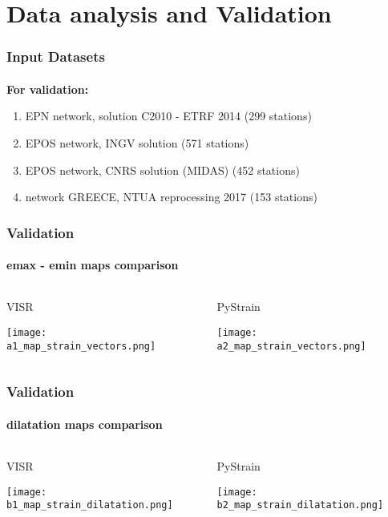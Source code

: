 \section{Data analysis and Validation}

\graphicspath{{Chapter3/Figs/}}

\begin{frame}
  \frametitle{Input Datasets}
  \framesubtitle{}
  \label{ch3:data}
  
  \textbf{For validation:}
  \begin{enumerate}
    \item EPN network, solution C2010 - ETRF 2014 (299 stations)
    \item EPOS network, INGV solution (571 stations)
    \item EPOS network, CNRS solution (MIDAS) (452 stations)
    \item network GREECE, NTUA reprocessing 2017 (153 stations)
  \end{enumerate}
    
\end{frame}
\note{}

\begin{frame}
  \frametitle{Validation}
  \framesubtitle{emax - emin maps comparison}
  \label{ch3:data}
  
  \begin{columns}
    \begin{column}{0.5\textwidth}
      VISR
      
      \texttt{[image: a1\_map\_strain\_vectors.png]}   
    \end{column}
    \begin{column}{0.5\textwidth}
    \begin{center}
      PyStrain
      
      \texttt{[image: a2\_map\_strain\_vectors.png]}     
    \end{center}
    \end{column}
  \end{columns}

\end{frame}
\note{}

\begin{frame}
  \frametitle{Validation}
  \framesubtitle{dilatation maps comparison}
  \label{ch3:data}
  
  \begin{columns}
    \begin{column}{0.5\textwidth}
      VISR
      
      \texttt{[image: b1\_map\_strain\_dilatation.png]}   
    \end{column}
    \begin{column}{0.5\textwidth}
    \begin{center}
      PyStrain
      
      \texttt{[image: b2\_map\_strain\_dilatation.png]}     
    \end{center}
    \end{column}
  \end{columns}

\end{frame}
\note{}

